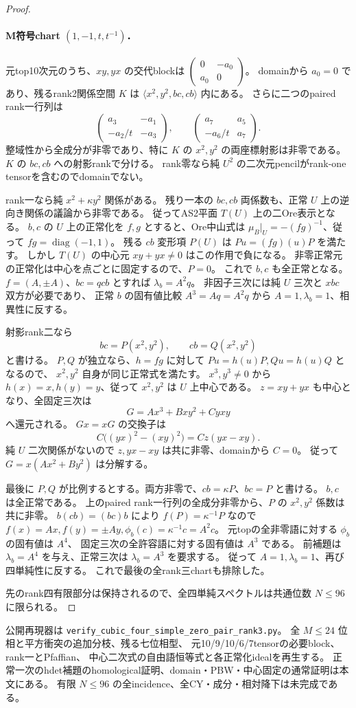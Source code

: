 \begin{proof}
\paragraph{M符号chart $(1,-1,t,t^{-1})$．}
元top10次元のうち、$xy,yx$ の交代blockは
$\left(\begin{smallmatrix}0&-a_0\\a_0&0\end{smallmatrix}\right)$。
domainから $a_0=0$ であり、残るrank2関係空間 $K$ は
$\langle x^2,y^2,bc,cb\rangle$ 内にある。
さらに二つのpaired rank一行列は
\[
 \begin{pmatrix}a_3&-a_1\\-a_2/t&-a_3\end{pmatrix},\qquad
 \begin{pmatrix}a_7&a_5\\-a_6/t&a_7\end{pmatrix}.
\]
整域性から全成分が非零であり、特に $K$ の $x^2,y^2$ の両座標射影は非零である。
$K$ の $bc,cb$ への射影rankで分ける。
rank零なら純 $U^2$ の二次元pencilがrank-one tensorを含むのでdomainでない。

rank一なら純 $x^2+\kappa y^2$ 関係がある。
残り一本の $bc,cb$ 両係数も、正常 $U$ 上の逆向き関係の議論から非零である。
従ってAS2平面 $T(U)$ 上の二Ore表示となる。
$b,c$ の $U$ 上の正常化を $f,g$ とすると、Ore中山式は
$\mu_B|_U=-(fg)^{-1}$、従って $fg=\operatorname{diag}(-1,1)$。
残る $cb$ 変形項 $P(U)$ は $Pu=(fg)(u)P$ を満たす。
しかし $T(U)$ の中心元 $xy+yx\ne0$ はこの作用で負になる。
非零正常元の正常化は中心を点ごとに固定するので、$P=0$。
これで $b,c$ も全正常となる。
$f=(A,\pm A)$、$bc=qcb$ とすれば $\lambda_b=A^2q$。
非因子三次には純 $U$ 三次と $xbc$ 双方が必要であり、
正常 $b$ の固有値比較 $A^3=Aq=A^2q$ から $A=1,\lambda_b=1$、相異性に反する。

射影rank二なら
\[
 bc=P(x^2,y^2),\qquad cb=Q(x^2,y^2)
\]
と書ける。
$P,Q$ が独立なら、$h=fg$ に対して $Pu=h(u)P,Qu=h(u)Q$ となるので、
$x^2,y^2$ 自身が同じ正常式を満たす。
$x^3,y^3\ne0$ から $h(x)=x,h(y)=y$、従って $x^2,y^2$ は $U$ 上中心である。
$z=xy+yx$ も中心となり、全固定三次は
\[
 G=A x^3+Bxy^2+Cyxy
\]
へ還元される。
$Gx=xG$ の交換子は
\[
 C\bigl((yx)^2-(xy)^2\bigr)=Cz(yx-xy).
\]
純 $U$ 二次関係がないので $z,yx-xy$ は共に非零、domainから $C=0$。
従って $G=x(Ax^2+By^2)$ は分解する。

最後に $P,Q$ が比例するとする。両方非零で、$cb=\kappa P$、$bc=P$ と書ける。
$b,c$ は全正常である。
上のpaired rank一行列の全成分非零から、$P$ の $x^2,y^2$ 係数は共に非零。
$b(cb)=(bc)b$ により $f(P)=\kappa^{-1}P$ なので
$f(x)=Ax,f(y)=\pm Ay,\phi_b(c)=\kappa^{-1}c=A^2c$。
元topの全非零語に対する $\phi_b$ の固有値は $A^4$、
固定三次の全許容語に対する固有値は $A^3$ である。
前補題は $\lambda_b=A^4$ を与え、正常三次は $\lambda_b=A^3$ を要求する。
従って $A=1,\lambda_b=1$、再び四単純性に反する。
これで最後の全rank三chartも排除した。

先のrank四有限部分は保持されるので、全四単純スペクトルは共通位数 $N\le96$ に限られる。
\end{proof}

公開再現器は \texttt{verify\_cubic\_four\_simple\_zero\_pair\_rank3.py}。
全 $M\le24$ 位相と平方衝突の追加分枝、残る七位相型、
元10/9/10/6/7tensorの必要block、rank一とPfaffian、
中心二次式の自由語恒等式と各正常化idealを再生する。
正常一次のhdet補題のhomological証明、domain・PBW・中心固定の通常証明は本文にある。
有限 $N\le96$ の全incidence、全CY・成分・相対降下は未完成である。
